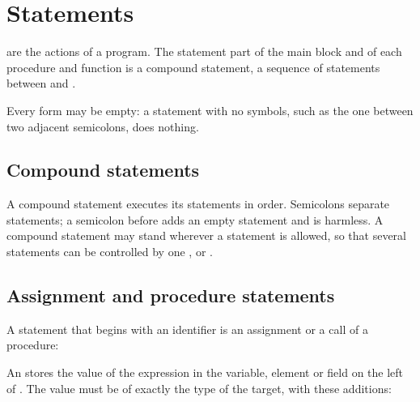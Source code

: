 \chapter{Statements}

 are the actions of a program.  The statement part of
the main block and of each procedure and function is a compound statement,
a sequence of statements between  and .


Every form may be empty: a statement with no symbols, such as the one
between two adjacent semicolons, does nothing.

\section{Compound statements}

A compound statement executes its statements in order.  Semicolons
separate statements; a semicolon before  adds an empty statement
and is harmless.  A compound statement may stand wherever a statement is
allowed, so that several statements can be controlled by one ,
 or .

\section{Assignment and procedure statements}
A statement that begins with an identifier is an assignment or a call of a
procedure:


An  stores the value of the expression in the variable,
element or field on the left of \code{:=}.  The value must be of exactly
the type of the target, with these additions:


